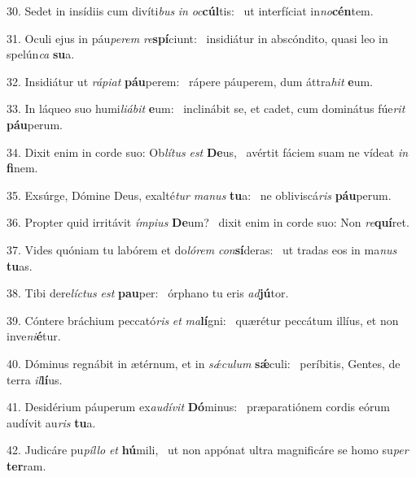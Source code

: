 30. Sedet in insídiis cum divíti\textit{bus} \textit{in} \textit{oc}\textbf{cúl}tis: \ast\  ut interfíciat in\textit{no}\textbf{cén}tem.\

31. Oculi ejus in páu\textit{pe}\textit{rem} \textit{re}\textbf{spí}ciunt: \ast\  insidiátur in abscóndito, quasi leo in spelún\textit{ca} \textbf{su}a.\

32. Insidiátur ut \textit{rá}\textit{pi}\textit{at} \textbf{páu}perem: \ast\  rápere páuperem, dum áttra\textit{hit} \textbf{e}um.\

33. In láqueo suo humi\textit{li}\textit{á}\textit{bit} \textbf{e}um: \ast\  inclinábit se, et cadet, cum dominátus fúe\textit{rit} \textbf{páu}perum.\

34. Dixit enim in corde suo: Ob\textit{lí}\textit{tus} \textit{est} \textbf{De}us, \ast\  avértit fáciem suam ne vídeat \textit{in} \textbf{fi}nem.\

35. Exsúrge, Dómine Deus, exalté\textit{tur} \textit{ma}\textit{nus} \textbf{tu}a: \ast\  ne obliviscá\textit{ris} \textbf{páu}perum.\

36. Propter quid irritávit \textit{ím}\textit{pi}\textit{us} \textbf{De}um? \ast\  dixit enim in corde suo: Non \textit{re}\textbf{quí}ret.\

37. Vides quóniam tu labórem et do\textit{ló}\textit{rem} \textit{con}\textbf{sí}deras: \ast\  ut tradas eos in ma\textit{nus} \textbf{tu}as.\

38. Tibi dere\textit{líc}\textit{tus} \textit{est} \textbf{pau}per: \ast\  órphano tu eris \textit{ad}\textbf{jú}tor.\

39. Cóntere bráchium peccató\textit{ris} \textit{et} \textit{ma}\textbf{lí}gni: \ast\  quærétur peccátum illíus, et non inve\textit{ni}\textbf{é}tur.\

40. Dóminus regnábit in ætérnum, et in \textit{sǽ}\textit{cu}\textit{lum} \textbf{sǽ}culi: \ast\  períbitis, Gentes, de terra \textit{il}\textbf{lí}us.\

41. Desidérium páuperum ex\textit{au}\textit{dí}\textit{vit} \textbf{Dó}minus: \ast\  præparatiónem cordis eórum audívit au\textit{ris} \textbf{tu}a.\

42. Judicáre pu\textit{píl}\textit{lo} \textit{et} \textbf{hú}mili, \ast\  ut non appónat ultra magnificáre se homo su\textit{per} \textbf{ter}ram.\

